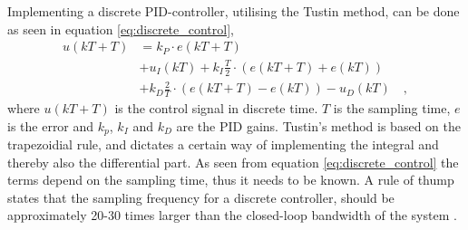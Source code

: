 \documentclass[../../main.tex]{subfiles}
\begin{document}
Implementing a discrete PID-controller, utilising the Tustin method, can be done as seen in equation \ref{eq:discrete_control}, 
\begin{equation}\label{eq:discrete_control}
\begin{split}
        u(kT+T) &= k_P\cdot e(kT+T)\\&+u_I(kT) + k_I\frac{T}{2} \cdot (e(kT+T)+e(kT))\\ &+k_D \frac{2}{T}\cdot(e(kT+T)-e(kT))-u_D(kT) \quad ,
\end{split}
\end{equation}
where $u(kT+T)$ is the control signal in discrete time. $T$ is the sampling time, $e$ is the error and $k_p$, $k_I$ and $k_D$ are the PID gains. Tustin's method is based on the trapezoidial rule, and dictates a certain way of implementing the integral and thereby also the differential part. As seen from equation \ref{eq:discrete_control} the terms depend on the sampling time, thus it needs to be known. A rule of thump states that the sampling frequency for a discrete controller, should be approximately 20-30 times larger than the closed-loop bandwidth of the system \cite{Design_Of_Digital_Control_Systems_NOTE}. 
\end{document}

